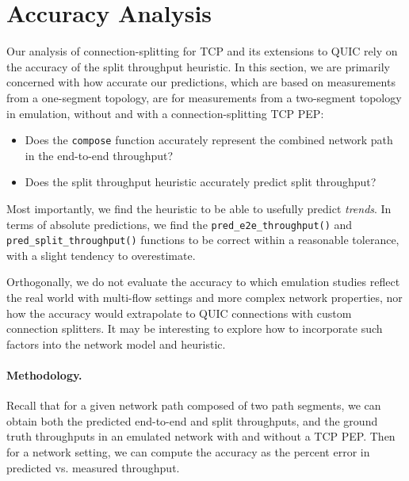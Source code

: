\section{Accuracy Analysis}
\label{sec:accuracy}



Our analysis of connection-splitting for TCP and its extensions to QUIC rely on
the accuracy of the split throughput heuristic. In this section, we are
primarily concerned with how accurate our predictions, which are based on
measurements from a one-segment topology, are for measurements from a
two-segment topology in emulation, without and with a connection-splitting TCP
PEP:
\begin{itemize}[noitemsep]
\item Does the \texttt{compose} function accurately represent the combined
 network path in the end-to-end throughput?
\item Does the split throughput heuristic accurately predict split throughput?
\end{itemize}

\noindent Most importantly, we find the heuristic to be able to usefully
 predict \textit{trends}.
 In terms of absolute predictions, we find the \texttt{pred\_e2e\_throughput()}
 and \texttt{pred\_split\_throughput()} functions to be correct within a
 reasonable tolerance, with a slight tendency to overestimate.

Orthogonally, we do not evaluate the accuracy to which emulation studies reflect
the real world with multi-flow settings and more complex network properties,
nor how the accuracy would extrapolate to QUIC connections with custom
connection splitters. It may be interesting to explore how to incorporate
such factors into the network model and heuristic.

\paragraph{Methodology.} Recall that for a given network path composed of two
 path segments, we can obtain both the predicted end-to-end and split
 throughputs, and the ground truth throughputs in an emulated network with and
 without a TCP PEP. Then for a network setting, we can compute the accuracy as
 the percent error in predicted vs. measured throughput.

